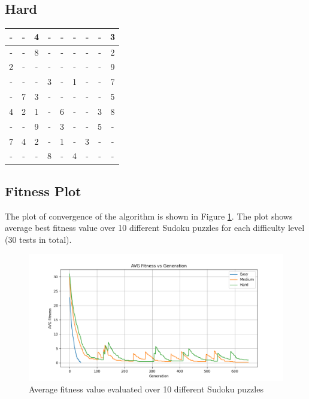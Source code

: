 \documentclass[12pt]{article}
\begin{document}
\subsection{Hard}
\begin{center}
	\begin{tabular}{|c|c|c|c|c|c|c|c|c|}
		\hline
		- & - & 4 & - & - & - & - & - & 3 \\ \hline
		- & - & 8 & - & - & - & - & - & 2 \\ \hline
		2 & - & - & - & - & - & - & - & 9 \\ \hline
		- & - & - & 3 & - & 1 & - & - & 7 \\ \hline
		- & 7 & 3 & - & - & - & - & - & 5 \\ \hline
		4 & 2 & 1 & - & 6 & - & - & 3 & 8 \\ \hline
		- & - & 9 & - & 3 & - & - & 5 & - \\ \hline
		7 & 4 & 2 & - & 1 & - & 3 & - & - \\ \hline
		- & - & - & 8 & - & 4 & - & - & - \\ \hline
	\end{tabular}
\end{center}

\subsection{Fitness Plot}
The plot of convergence of the algorithm is shown
in Figure \ref{fig:avg_fitness}. The plot shows average best
fitness value over 10 different Sudoku puzzles
for each difficulty level (30 tests in total).
\begin{figure}[h]
	\centering
	\includegraphics[width=\textwidth]{figures/plot.png}
	\caption{Average fitness value evaluated over 10 different Sudoku puzzles}
	\label{fig:avg_fitness}
\end{figure}
\end{document}
